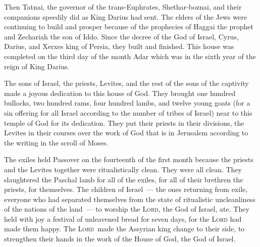 \begin{inparaenum}\setcounter{enumi}{12}
     Then Tatnai, the governor of the trans-Euphrates, Shethar-boznai, and their companions speedily did as King Darius had sent.%
     The elders of the Jews were continuing to build and prosper because of the prophecies of Haggai the prophet and Zechariah the son of Iddo. Since the decree of the God of Israel, Cyrus, Darius, and Xerxes king of Persia, they built and finished.%
     This house was completed on the third day of the month Adar which was in the sixth year of the reign of King Darius.%
    
     The sons of Israel, the priests, Levites, and the rest of the sons of the captivity made a joyous dedication to this house of God.%
     They brought one hundred bullocks, two hundred rams, four hundred lambs, and twelve young goats (for a sin offering for all Israel according to the number of tribes of Israel) near to this temple of God for its dedication.%
     They put their priests in their divisions, the Levites in their courses over the work of God that is in Jerusalem according to the writing in the scroll of Moses.%
    
     The exiles held Passover on the fourteenth of the first month%
     because the priests and the Levites together were ritualistically clean. They were all clean. They slaughtered the Paschal lamb for all of the exiles, for all of their brethren the priests, for themselves.%
     The children of Israel~--- the ones returning from exile, everyone who had separated themselves from the state of ritualistic uncleanliness of the nations of the land~--- to worship the \textsc{Lord}, the God of Israel, ate.%
     They held with joy a festival of unleavened bread for seven days, for the \textsc{Lord} had made them happy. The \textsc{Lord}\understood\ made the Assyrian king change to their side, to strengthen their hands in the work of the House of God, the God of Israel.%
\end{inparaenum}
